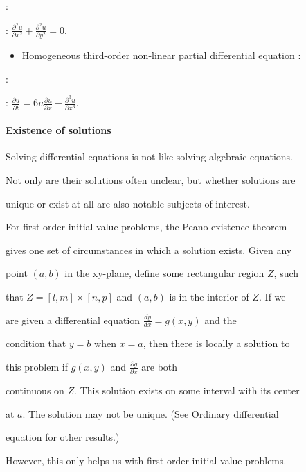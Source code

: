:   



    :   $\frac{\partial^2 u}{\partial x^2} + \frac{\partial^2 u}{\partial y^2} = 0.$



\begin{itemize}
    \item Homogeneous third-order non-linear partial differential equation :
\end{itemize}

:   



    :   $\frac{\partial u}{\partial t} = 6u\frac{\partial u}{\partial x} - \frac{\partial^3 u}{\partial x^3}.$



\paragraph{Existence of solutions}



Solving differential equations is not like solving algebraic equations.

Not only are their solutions often unclear, but whether solutions are

unique or exist at all are also notable subjects of interest.



For first order initial value problems, the Peano existence theorem

gives one set of circumstances in which a solution exists. Given any

point $(a,b)$ in the xy-plane, define some rectangular region $Z$, such

that $Z = [l,m]\times[n,p]$ and $(a,b)$ is in the interior of $Z$. If we

are given a differential equation $\frac{dy}{dx} = g(x,y)$ and the

condition that $y=b$ when $x=a$, then there is locally a solution to

this problem if $g(x,y)$ and $\frac{\partial g}{\partial x}$ are both

continuous on $Z$. This solution exists on some interval with its center

at $a$. The solution may not be unique. (See Ordinary differential

equation for other results.)



However, this only helps us with first order initial value problems.

